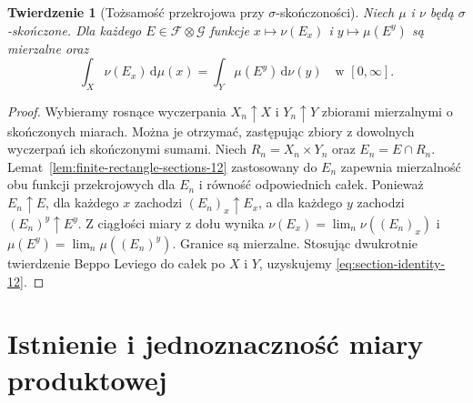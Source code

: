 \documentclass[11pt,a4paper,oneside]{book}
\numberwithin{equation}{chapter}
\theoremstyle{plain}
\newtheorem{twierdzenie}{Twierdzenie}[chapter]
\theoremstyle{definition}
\theoremstyle{remark}
\begin{document}
\begin{twierdzenie}[Tożsamość przekrojowa przy $\sigma$-skończoności]
\label{thm:section-identity-12}
Niech $\mu$ i $\nu$ będą $\sigma$-skończone.
Dla każdego $E\in\mathcal F\otimes\mathcal G$
funkcje $x\mapsto\nu(E_x)$ i $y\mapsto\mu(E^y)$
są mierzalne oraz
\begin{equation}\label{eq:section-identity-12}
\int_X\nu(E_x)\,\mathrm d\mu(x)
=\int_Y\mu(E^y)\,\mathrm d\nu(y)
\quad\text{w }[0,\infty].
\end{equation}
\end{twierdzenie}
\begin{proof}
Wybieramy rosnące wyczerpania
$X_n\uparrow X$ i $Y_n\uparrow Y$ zbiorami mierzalnymi
o skończonych miarach. Można je otrzymać, zastępując
zbiory z dowolnych wyczerpań ich skończonymi sumami.
Niech $R_n=X_n\times Y_n$ oraz $E_n=E\cap R_n$.
Lemat~\ref{lem:finite-rectangle-sections-12}
zastosowany do $E_n$ zapewnia mierzalność obu
funkcji przekrojowych dla $E_n$ i równość odpowiednich
całek. Ponieważ $E_n\uparrow E$, dla każdego $x$
zachodzi $(E_n)_x\uparrow E_x$, a dla każdego $y$
zachodzi $(E_n)^y\uparrow E^y$. Z ciągłości miary
z dołu wynika
$\nu(E_x)=\lim_n\nu((E_n)_x)$ i
$\mu(E^y)=\lim_n\mu((E_n)^y)$. Granice są
mierzalne. Stosując dwukrotnie twierdzenie
Beppo Leviego do całek po $X$ i $Y$, uzyskujemy
\eqref{eq:section-identity-12}.
\end{proof}

\section{Istnienie i jednoznaczność miary produktowej}
\end{document}
